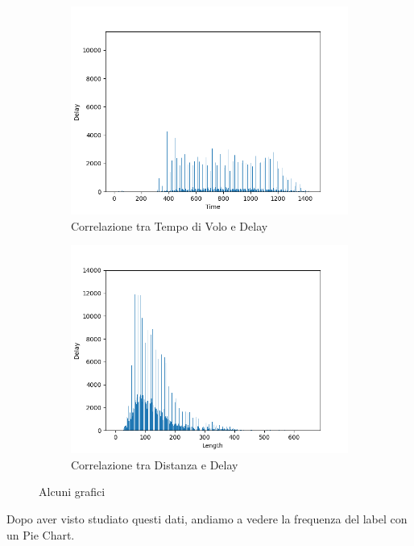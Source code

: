 \documentclass{article}
\begin{document}
\begin{figure}[H]
\begin{subfigure}[b]{0.4\linewidth}
    \includegraphics[width=\linewidth]{TimeDelayCorrelation}
    \caption{Correlazione tra Tempo di Volo e Delay}
  \end{subfigure}
  \begin{subfigure}[b]{0.4\linewidth}
    \includegraphics[width=\linewidth]{DistanzaDelayCorrelation}
    \caption{Correlazione tra Distanza e Delay}
  \end{subfigure}
  \caption{Alcuni grafici}
  \label{fig:image1}
\end{figure}
\pagebreak
Dopo aver visto studiato questi dati, andiamo a vedere la frequenza del label con un Pie Chart.
\end{document}
